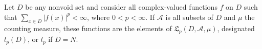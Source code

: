 Let $D$ be any nonvoid set and consider all complex-valued functions $f$ on $D$ such that $\sum_{x \in D} |f(x)|^p < \infty$, where $0 < p < \infty$. If $\mathcal{A}$ is all subsets of $D$ and $\mu$ the counting measure, these functions are the elements of $\mathfrak{L}_p(D, \mathcal{A}, \mu)$, designated $l_p(D)$, or $l_p$ if $D = N$.
